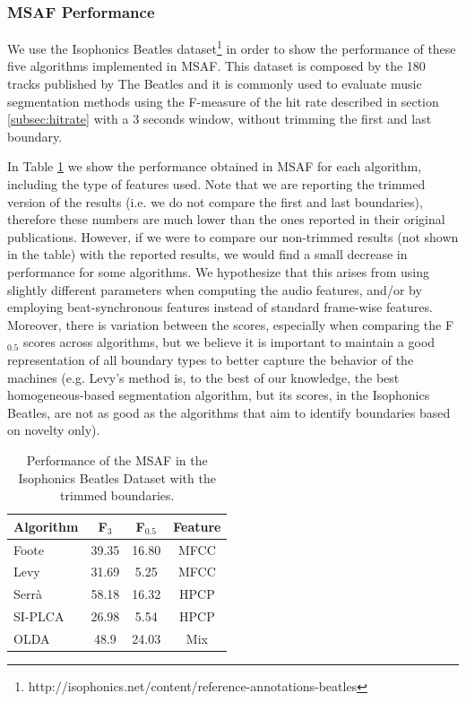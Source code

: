 \documentclass{article}
\begin{document}
\subsubsection{MSAF Performance}\label{subsub:performance}

We use the Isophonics Beatles dataset\footnote{http://isophonics.net/content/reference-annotations-beatles} in order to show the performance of these five algorithms implemented in MSAF.
This dataset is composed by the 180 tracks published by The Beatles and it is commonly used to evaluate music segmentation methods using the F-measure of the hit rate described in section \ref{subsec:hitrate} with a 3 seconds window, without trimming the first and last boundary.

In Table \ref{tab:machine-algo-performance} we show the performance obtained in MSAF for each algorithm, including the type of features used.
Note that we are reporting the trimmed version of the results (i.e. we do not compare the first and last boundaries), therefore these numbers are much lower than the ones reported in their original publications.
However, if we were to compare our non-trimmed results (not shown in the table) with the reported results, we would find a small decrease in performance for some algorithms.
We hypothesize that this arises from using slightly different parameters when computing the audio features, and/or by employing beat-synchronous features instead of standard frame-wise features.
Moreover, there is variation between the scores, especially when comparing the F$_{0.5}$ scores across algorithms, but we believe it is important to maintain a good representation of all boundary types to better capture the behavior of the machines (e.g. Levy's method is, to the best of our knowledge, the best homogeneous-based segmentation algorithm, but its scores, in the Isophonics Beatles, are not as good as the algorithms that aim to identify boundaries based on novelty only).

\begin{table}
 \begin{center}
   \begin{tabular}{|l|c|c|c|}
  \hline
  Algorithm & F$_3$ & F$_{0.5}$ & Feature\\
  \hline
  Foote     & 39.35 & 16.80 & MFCC\\
  Levy      & 31.69 & 5.25 & MFCC\\
  Serr\`a   & 58.18 & 16.32 & HPCP\\
  SI-PLCA   & 26.98 & 5.54 & HPCP\\
  OLDA      & 48.9 & 24.03 & Mix\\
  \hline
 \end{tabular}
\end{center}
 \caption{Performance of the MSAF in the Isophonics Beatles Dataset with the trimmed boundaries.}
 \label{tab:machine-algo-performance}
\end{table}
\end{document}

